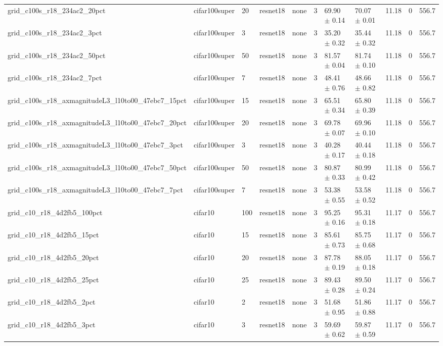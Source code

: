 \begin{tabular}{lllllllllll}
grid_c100s_r18_234ac2_20pct & cifar100super & 20 & resnet18 & none & 3 & 69.90 $\pm$ 0.14 & 70.07 $\pm$ 0.01 & 11.18 & 0 & 556.7 \\
grid_c100s_r18_234ac2_3pct & cifar100super & 3 & resnet18 & none & 3 & 35.20 $\pm$ 0.32 & 35.44 $\pm$ 0.32 & 11.18 & 0 & 556.7 \\
grid_c100s_r18_234ac2_50pct & cifar100super & 50 & resnet18 & none & 3 & 81.57 $\pm$ 0.04 & 81.74 $\pm$ 0.10 & 11.18 & 0 & 556.7 \\
grid_c100s_r18_234ac2_7pct & cifar100super & 7 & resnet18 & none & 3 & 48.41 $\pm$ 0.76 & 48.66 $\pm$ 0.82 & 11.18 & 0 & 556.7 \\
grid_c100s_r18_axmagnitudeL3_l10to00_47ebc7_15pct & cifar100super & 15 & resnet18 & none & 3 & 65.51 $\pm$ 0.34 & 65.80 $\pm$ 0.39 & 11.18 & 0 & 556.7 \\
grid_c100s_r18_axmagnitudeL3_l10to00_47ebc7_20pct & cifar100super & 20 & resnet18 & none & 3 & 69.78 $\pm$ 0.07 & 69.96 $\pm$ 0.10 & 11.18 & 0 & 556.7 \\
grid_c100s_r18_axmagnitudeL3_l10to00_47ebc7_3pct & cifar100super & 3 & resnet18 & none & 3 & 40.28 $\pm$ 0.17 & 40.44 $\pm$ 0.18 & 11.18 & 0 & 556.7 \\
grid_c100s_r18_axmagnitudeL3_l10to00_47ebc7_50pct & cifar100super & 50 & resnet18 & none & 3 & 80.87 $\pm$ 0.33 & 80.99 $\pm$ 0.42 & 11.18 & 0 & 556.7 \\
grid_c100s_r18_axmagnitudeL3_l10to00_47ebc7_7pct & cifar100super & 7 & resnet18 & none & 3 & 53.38 $\pm$ 0.55 & 53.58 $\pm$ 0.52 & 11.18 & 0 & 556.7 \\
grid_c10_r18_4d2fb5_100pct & cifar10 & 100 & resnet18 & none & 3 & 95.25 $\pm$ 0.16 & 95.31 $\pm$ 0.18 & 11.17 & 0 & 556.7 \\
grid_c10_r18_4d2fb5_15pct & cifar10 & 15 & resnet18 & none & 3 & 85.61 $\pm$ 0.73 & 85.75 $\pm$ 0.68 & 11.17 & 0 & 556.7 \\
grid_c10_r18_4d2fb5_20pct & cifar10 & 20 & resnet18 & none & 3 & 87.78 $\pm$ 0.19 & 88.05 $\pm$ 0.18 & 11.17 & 0 & 556.7 \\
grid_c10_r18_4d2fb5_25pct & cifar10 & 25 & resnet18 & none & 3 & 89.43 $\pm$ 0.28 & 89.50 $\pm$ 0.24 & 11.17 & 0 & 556.7 \\
grid_c10_r18_4d2fb5_2pct & cifar10 & 2 & resnet18 & none & 3 & 51.68 $\pm$ 0.95 & 51.86 $\pm$ 0.88 & 11.17 & 0 & 556.7 \\
grid_c10_r18_4d2fb5_3pct & cifar10 & 3 & resnet18 & none & 3 & 59.69 $\pm$ 0.62 & 59.87 $\pm$ 0.59 & 11.17 & 0 & 556.7 \\

\end{tabular}
